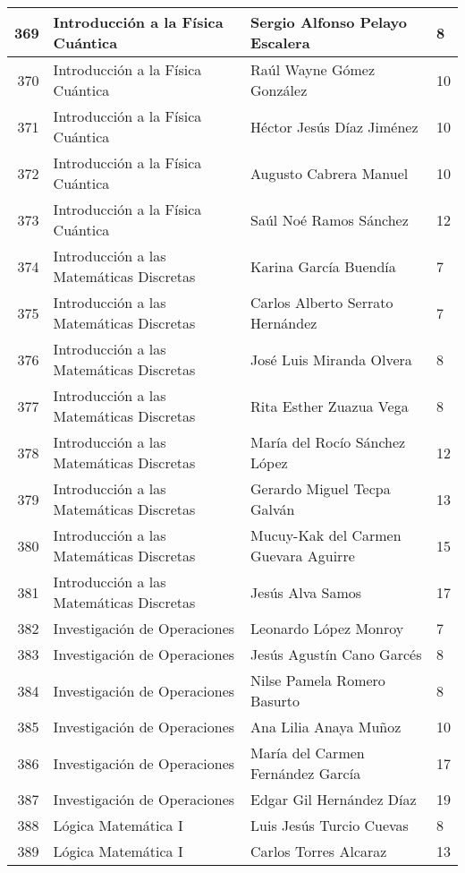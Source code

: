 \begin{table}[ht]
\begin{tabular}{rlll}
  369 & Introducción a la Física Cuántica & Sergio Alfonso Pelayo Escalera & 8 \\ \hline
  370 & Introducción a la Física Cuántica & Raúl Wayne Gómez González & 10 \\ \hline
  371 & Introducción a la Física Cuántica & Héctor Jesús Díaz Jiménez & 10 \\ \hline
  372 & Introducción a la Física Cuántica & Augusto Cabrera Manuel & 10 \\ \hline
  373 & Introducción a la Física Cuántica & Saúl Noé Ramos Sánchez & 12 \\ \hline
  374 & Introducción a las Matemáticas Discretas & Karina García Buendía & 7 \\ \hline
  375 & Introducción a las Matemáticas Discretas & Carlos Alberto Serrato Hernández & 7 \\ \hline
  376 & Introducción a las Matemáticas Discretas & José Luis Miranda Olvera & 8 \\ \hline
  377 & Introducción a las Matemáticas Discretas & Rita Esther Zuazua Vega & 8 \\ \hline
  378 & Introducción a las Matemáticas Discretas & María del Rocío Sánchez López & 12 \\ \hline
  379 & Introducción a las Matemáticas Discretas & Gerardo Miguel Tecpa Galván & 13 \\ \hline
  380 & Introducción a las Matemáticas Discretas & Mucuy-Kak del Carmen Guevara Aguirre & 15 \\ \hline
  381 & Introducción a las Matemáticas Discretas & Jesús Alva Samos & 17 \\ \hline
  382 & Investigación de Operaciones & Leonardo López Monroy & 7 \\ \hline
  383 & Investigación de Operaciones & Jesús Agustín Cano Garcés & 8 \\ \hline
  384 & Investigación de Operaciones & Nilse Pamela Romero Basurto & 8 \\ \hline
  385 & Investigación de Operaciones & Ana Lilia Anaya Muñoz & 10 \\ \hline
  386 & Investigación de Operaciones & María del Carmen Fernández García & 17 \\ \hline
  387 & Investigación de Operaciones & Edgar Gil Hernández Díaz & 19 \\ \hline
  388 & Lógica Matemática I & Luis Jesús Turcio Cuevas & 8 \\ \hline
  389 & Lógica Matemática I & Carlos Torres Alcaraz & 13 \\ \hline

\end{tabular}
\end{table}
